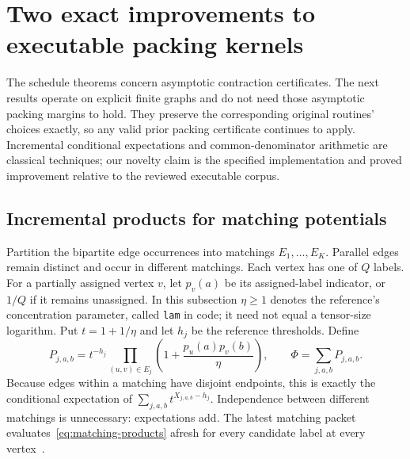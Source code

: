 \section{Two exact improvements to executable packing kernels}\label{sec:kernels}
The schedule theorems concern asymptotic contraction certificates. The next
results operate on explicit finite graphs and do not need those asymptotic
packing margins to hold. They preserve the corresponding original routines'
choices exactly, so any valid prior packing certificate continues to apply.
Incremental conditional expectations and common-denominator arithmetic are
classical techniques; our novelty claim is the specified implementation and
proved improvement relative to the reviewed executable corpus.

\subsection{Incremental products for matching potentials}
Partition the bipartite edge occurrences into matchings $E_1,\ldots,E_K$.
Parallel edges remain distinct and occur in different matchings. Each vertex
has one of $Q$ labels. For a partially assigned vertex $v$, let $p_v(a)$ be
its assigned-label indicator, or $1/Q$ if it remains unassigned. In this
subsection $\eta\ge1$ denotes the reference's concentration parameter, called
\texttt{lam} in code; it need not equal a tensor-size logarithm. Put
$t=1+1/\eta$ and let $h_j$ be the reference thresholds. Define
\begin{equation}\label{eq:matching-products}
 P_{j,a,b}=t^{-h_j}\prod_{(u,v)\in E_j}
 \left(1+\frac{p_u(a)p_v(b)}{\eta}\right),\qquad
 \Phi=\sum_{j,a,b}P_{j,a,b}.
\end{equation}
Because edges within a matching have disjoint endpoints, this is exactly the
conditional expectation of $\sum_{j,a,b}t^{X_{j,a,b}-h_j}$. Independence
between different matchings is unnecessary: expectations add. The latest
matching packet evaluates~\eqref{eq:matching-products} afresh for every
candidate label at every vertex~\cite{matching}.

